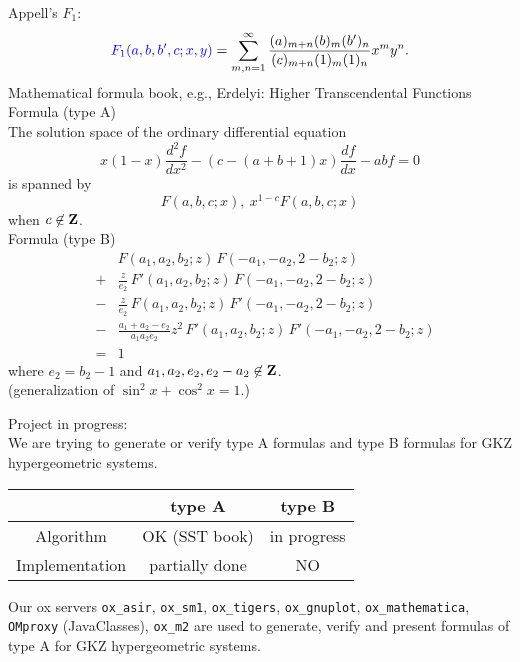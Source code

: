 \documentclass{slides}
\begin{document}
\noindent
Appell's $F_1$:
$$ {\color{blue} F_1(a,b,b',c;x,y)} = \sum_{m,n=1}^\infty
  \frac{(a)_{m+n} (b)_m (b')_n}{(c)_{m+n}(1)_m (1)_n} x^m y^n.
$$
\newpage
Mathematical formula book, e.g.,
Erdelyi: {\color{green} Higher Transcendental Functions} \\
{\color{blue} Formula (type A)}\\
The solution space of the ordinary differential equation
$$ x(1-x) \frac{d^2f}{dx^2} -\left( c-(a+b+1)x \right) \frac{df}{dx} - a b f = 0$$
is spanned by
$$ F(a,b,c;x) , \  x^{1-c} F(a,b,c;x) $$
when $c \not\in {\bf Z}$. \\
{\color{blue} Formula (type B)}\\
\begin{eqnarray*}
&\ & F(a_1, a_2, b_2;z) \, F(-a_1,-a_2,2-b_2;z)  \\
&+& \frac{z}{e_2}\, F'(a_1, a_2, b_2;z) \, F(-a_1,-a_2,2-b_2;z)  \\
&-& \frac{z}{e_2}\, F(a_1, a_2, b_2;z) \, F'(-a_1,-a_2,2-b_2;z)  \\
&-& \frac{a_1+a_2-e_2}{a_1 a_2 e_2}z^2\,
  F'(a_1, a_2, b_2;z)\,F'(-a_1,-a_2,2-b_2;z) \\
&=& 1
\end{eqnarray*}
where $e_2 = b_2-1$ and $a_1, a_2, e_2, e_2-a_2 \not\in {\bf Z}$.  \\
(generalization of $\sin^2 x + \cos^2 x =1$.)

\noindent
Project in progress: \\
We are trying to generate or verify type A formulas and type B formulas
for {\color{blue} GKZ hypergeometric systems}.

\begin{tabular}{|c|c|c|}
\hline
  & type A & type B \\ \hline
Algorithm &  {\color{red} OK} (SST book) &  in progress \\ \hline
Implementation & partially done & NO \\ \hline
\end{tabular}

\noindent
Our ox servers
{\tt ox\_asir}, {\tt ox\_sm1}, {\tt ox\_tigers}, {\tt ox\_gnuplot},
{\tt ox\_mathematica}, {\tt OMproxy} (JavaClasses), {\tt ox\_m2}
are used to generate, verify and present formulas of type A
for GKZ hypergeometric systems.
\end{document}
